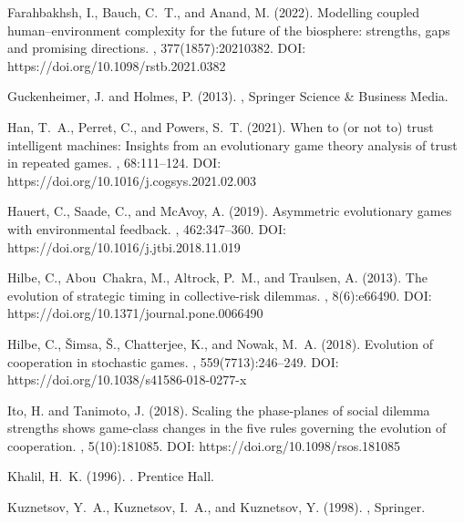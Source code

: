 \documentclass[9pt]{elife}
\begin{document}
\begin{thebibliography}{}
Farahbakhsh, I., Bauch, C.~T., and Anand, M. (2022).
\newblock Modelling coupled human--environment complexity for the future of the
  biosphere: strengths, gaps and promising directions.
,
  377(1857):20210382. DOI: https://doi.org/10.1098/rstb.2021.0382

Guckenheimer, J. and Holmes, P. (2013).
,
\newblock Springer Science \& Business Media.

Han, T.~A., Perret, C., and Powers, S.~T. (2021).
\newblock When to (or not to) trust intelligent machines: Insights from an
  evolutionary game theory analysis of trust in repeated games.
, 68:111--124. DOI: https://doi.org/10.1016/j.cogsys.2021.02.003

Hauert, C., Saade, C., and McAvoy, A. (2019).
\newblock Asymmetric evolutionary games with environmental feedback.
, 462:347--360. DOI: https://doi.org/10.1016/j.jtbi.2018.11.019

Hilbe, C., Abou~Chakra, M., Altrock, P.~M., and Traulsen, A. (2013).
\newblock The evolution of strategic timing in collective-risk dilemmas.
, 8(6):e66490. DOI: https://doi.org/10.1371/journal.pone.0066490

Hilbe, C., {\v{S}}imsa, {\v{S}}., Chatterjee, K., and Nowak, M.~A. (2018).
\newblock Evolution of cooperation in stochastic games.
, 559(7713):246--249. DOI: https://doi.org/10.1038/s41586-018-0277-x

Ito, H. and Tanimoto, J. (2018). 
\newblock Scaling the phase-planes of social dilemma strengths shows game-class changes in the five rules governing the evolution of cooperation. 
, 5(10):181085. DOI: https://doi.org/10.1098/rsos.181085

Khalil, H.~K. (1996).
.
\newblock Prentice Hall.

Kuznetsov, Y.~A., Kuznetsov, I.~A., and Kuznetsov, Y. (1998).
,
\newblock Springer.


\end{thebibliography}
\end{document}
